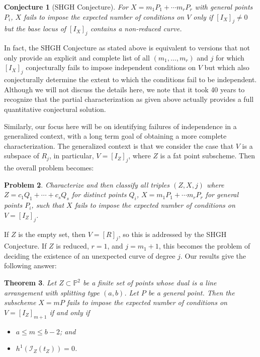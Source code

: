 \documentclass[12pt]{amsart}
\numberwithin{equation}{section}
\newtheorem{theorem}{Theorem}[section]
\newtheorem{problem}[theorem]{Problem}
\newtheorem{conjecture}[theorem]{Conjecture}
\theoremstyle{definition}
\begin{document}
\begin{conjecture}[SHGH Conjecture] For $X = m_1 P_1 + \cdots m_r P_r$ 
with  general points $P_i$, $X$ fails to impose the expected number 
of conditions on $V$ only if $[I_X]_j\neq 0$ but
the base locus of $[I_X]_j$ contains a non-reduced curve.\smallskip
\end{conjecture}

In fact, the SHGH Conjecture as stated above is equivalent to
versions \cite{Ha1, G, Hi} that not only provide an explicit and complete list of all 
$(m_1,\ldots,m_r)$ and $j$ for which $[I_X]_j$ conjecturally fails to 
impose independent conditions on $V$ but which also conjecturally
determine the extent to which the conditions fail to be independent.
Although we will not discuss the details here, we note that it took 
40 years \cite{refCM} to recognize that the partial characterization
as given above actually provides a full quantitative 
conjectural solution. 

Similarly, our focus here will be on identifying failures
of independence in a generalized context, with a long term
goal of obtaining a more complete characterization. The generalized 
context is that we consider the case that $V$ is a subspace of $R_j$, 
in particular, $V= [I_Z]_j$, where $Z$ is a fat point subscheme. Then 
the overall problem becomes:

\smallskip

\begin{problem}
  \label{prob:intro}
 Characterize and then classify all  triples $(Z,X,j)$
where $Z=c_1 Q_1+\cdots +c_s Q_s$ for distinct points $Q_i$, $X = m_1 P_1 + \cdots m_r P_r$
for general points $P_i$, such that $X$ fails to impose the expected number of conditions on $V = [I_Z]_j$.  
\end{problem}

If $Z$ is the empty set, then $V=[R]_j$, so this is addressed by the SHGH Conjecture. If $Z$ is reduced,  $r = 1$, and $j = m_1 + 1$, this becomes the problem of deciding the existence of an unexpected curve of degree $j$. Our results give the following answer: 

\begin{theorem}
   \label{thm:intro}
Let $Z \subset { \ensuremath{\mathbb{P}}}^2$ be a finite set of points whose dual is a line arrangement with splitting type $(a, b)$.  Let $P$ be a general point. Then the subscheme $X = m P$ fails to impose the expected number of conditions on  $V = [I_Z]_{m+1}$ if and only if 
\begin{itemize}
\item[(i)]  $a \le m \le b-2$; \quad and 

\item[(ii)] $h^1 ({\mathcal{I}}_{Z} (t_Z)) = 0$. 
\end{itemize} 
\end{theorem} 
\end{document}
